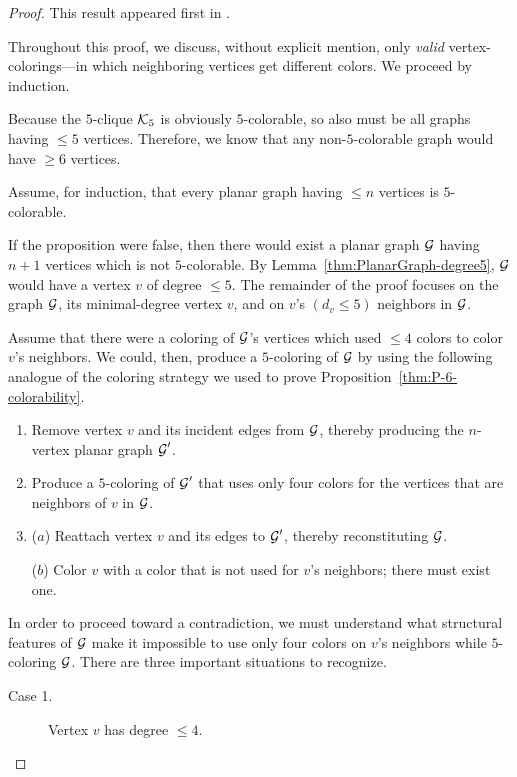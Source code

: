 \begin{proof}
This result appeared first in \cite{Heawood90}.

\smallskip

\noindent
Throughout this proof, we discuss, without explicit mention, only {\em valid} vertex-colorings---in which neighboring vertices get different colors.  We proceed by induction.

\medskip

Because the $5$-clique $\mbox{$\cal K$}_5$ is obviously $5$-colorable, so also must be all graphs having $\leq 5$ vertices.  Therefore, we know that any non-$5$-colorable graph would have $\geq 6$ vertices.

\medskip

Assume, for induction, that every planar graph having $\leq n$ vertices is $5$-colorable.

\medskip

If the proposition were false, then there would exist a planar graph $\mbox{$\cal G$}$ having $n+1$ vertices which is not $5$-colorable.  By Lemma~\ref{thm:PlanarGraph-degree5}, $\mbox{$\cal G$}$ would have a vertex $v$ of degree $\leq 5$.  The remainder of the proof focuses on the graph $\mbox{$\cal G$}$, its minimal-degree vertex $v$, and on $v$'s $(d_v \leq 5)$ neighbors in $\mbox{$\cal G$}$.

\smallskip

Assume that there were a coloring of $\mbox{$\cal G$}$'s vertices which used $\leq 4$ colors to color $v$'s neighbors.  We could, then, produce a $5$-coloring of $\mbox{$\cal G$}$ by using the following analogue of the coloring strategy we used to prove Proposition~\ref{thm:P-6-colorability}.
\begin{enumerate}
\item
Remove vertex $v$ and its incident edges from $\mbox{$\cal G$}$, thereby producing the $n$-vertex planar graph $\mbox{$\cal G$}'$.
\medskip\item
Produce a $5$-coloring of $\mbox{$\cal G$}'$ that uses only four colors for the vertices that are neighbors of $v$ in $\mbox{$\cal G$}$.
\medskip\item
($a$) Reattach vertex $v$ and its edges to $\mbox{$\cal G$}'$, thereby reconstituting $\mbox{$\cal G$}$.

\smallskip

($b$) Color $v$ with a color that is not used for $v$'s neighbors; there must exist one.
\end{enumerate}

\smallskip

In order to proceed toward a contradiction, we must understand what structural features of $\mbox{$\cal G$}$ make it impossible to use only four colors on $v$'s neighbors while $5$-coloring $\mbox{$\cal G$}$.  There are three important situations to recognize.
\begin{description}
\item[{\sf Case 1}.]
Vertex $v$ has degree $\leq 4$.


\end{description}
\end{proof}
